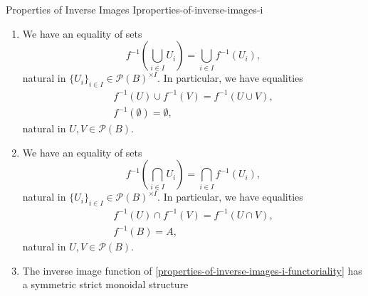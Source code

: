 \begin{proposition}{Properties of Inverse Images I}{properties-of-inverse-images-i}
\begin{enumerate}
\begin{enumerate}
\begin{enumerate}
                        \item We have $f_{*}(U)\subset V$;
                        \item We have $U\subset f^{-1}(V)$;
                    \end{enumerate}%
                \item The following conditions are equivalent:
                    \begin{enumerate}%
                        \item We have $f^{-1}(U)\subset V$.
                        \item We have $U\subset f_{!}(V)$.
                    \end{enumerate}%
            \end{enumerate}%
        \item\label{properties-of-inverse-images-i-preservation-of-colimits}We have an equality of sets
            \[
                    f^{-1}(\bigcup_{i\in I}U_{i})%
                    =%
                    \bigcup_{i\in I}f^{-1}(U_{i}),%
            \]%
            natural in $\{U_{i}\}_{i\in I}\in\mathcal{P}(B)^{\times I}$. In particular, we have equalities%
            \[
                \begin{gathered}
                    f^{-1}(U)\cup f^{-1}(V)                  = f^{-1}(U\cup V),\\
                    f^{-1}(\emptyset)                        = \emptyset,
                \end{gathered}
            \]%
            natural in $U,V\in\mathcal{P}(B)$.
        \item\label{properties-of-inverse-images-i-preservation-of-limits}We have an equality of sets
            \[
                    f^{-1}(\bigcap_{i\in I}U_{i})%
                    =%
                    \bigcap_{i\in I}f^{-1}(U_{i}),%
            \]%
            natural in $\{U_{i}\}_{i\in I}\in\mathcal{P}(B)^{\times I}$. In particular, we have equalities%
            \[
                \begin{gathered}
                    f^{-1}(U)\cap f^{-1}(V)                  = f^{-1}(U\cap V),\\
                    f^{-1}(B)                                = A,
                \end{gathered}
            \]%
            natural in $U,V\in\mathcal{P}(B)$.
        \item\label{properties-of-inverse-images-i-symmetric-strict-monoidality-with-respect-to-unions}The inverse image function of \cref{properties-of-inverse-images-i-functoriality} has a symmetric strict monoidal structure

\end{enumerate}
\end{proposition}
